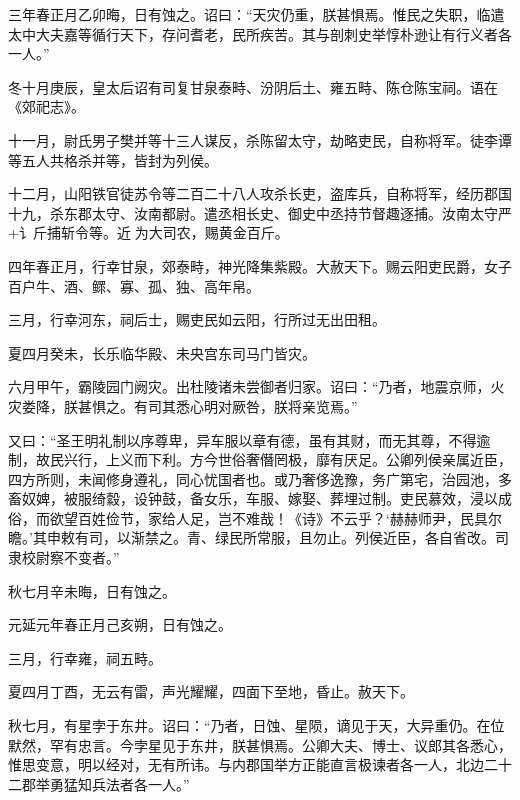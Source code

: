 \documentclass[12pt,UTF8]{ctexbook}
\begin{document}
三年春正月乙卯晦，日有蚀之。诏曰：“天灾仍重，朕甚惧焉。惟民之失职，临遣太中大夫嘉等循行天下，存问耆老，民所疾苦。其与剖刺史举惇朴逊让有行义者各一人。”



冬十月庚辰，皇太后诏有司复甘泉泰畤、汾阴后土、雍五畤、陈仓陈宝祠。语在《郊祀志》。



十一月，尉氏男子樊并等十三人谋反，杀陈留太守，劫略吏民，自称将军。徒李谭等五人共格杀并等，皆封为列侯。



十二月，山阳铁官徒苏令等二百二十八人攻杀长吏，盗库兵，自称将军，经历郡国十九，杀东郡太守、汝南都尉。遣丞相长史、御史中丞持节督趣逐捕。汝南太守严+讠斤捕斩令等。近为大司农，赐黄金百斤。



四年春正月，行幸甘泉，郊泰畤，神光降集紫殿。大赦天下。赐云阳吏民爵，女子百户牛、酒、鳏、寡、孤、独、高年帛。



三月，行幸河东，祠后士，赐吏民如云阳，行所过无出田租。



夏四月癸未，长乐临华殿、未央宫东司马门皆灾。



六月甲午，霸陵园门阙灾。出杜陵诸未尝御者归家。诏曰：“乃者，地震京师，火灾娄降，朕甚惧之。有司其悉心明对厥咎，朕将亲览焉。”



又曰：“圣王明礼制以序尊卑，异车服以章有德，虽有其财，而无其尊，不得逾制，故民兴行，上义而下利。方今世俗奢僭罔极，靡有厌足。公卿列侯亲属近臣，四方所则，未闻修身遵礼，同心忧国者也。或乃奢侈逸豫，务广第宅，治园池，多畜奴婢，被服绮縠，设钟鼓，备女乐，车服、嫁娶、葬埋过制。吏民慕效，浸以成俗，而欲望百姓俭节，家给人足，岂不难哉！《诗》不云乎？‘赫赫师尹，民具尔瞻。’其申敕有司，以渐禁之。青、绿民所常服，且勿止。列侯近臣，各自省改。司隶校尉察不变者。”



秋七月辛未晦，日有蚀之。



元延元年春正月己亥朔，日有蚀之。



三月，行幸雍，祠五畤。



夏四月丁酉，无云有雷，声光耀耀，四面下至地，昏止。赦天下。



秋七月，有星孛于东井。诏曰：“乃者，日蚀、星陨，谪见于天，大异重仍。在位默然，罕有忠言。今孛星见于东井，朕甚惧焉。公卿大夫、博士、议郎其各悉心，惟思变意，明以经对，无有所讳。与内郡国举方正能直言极谏者各一人，北边二十二郡举勇猛知兵法者各一人。”
\end{document}
